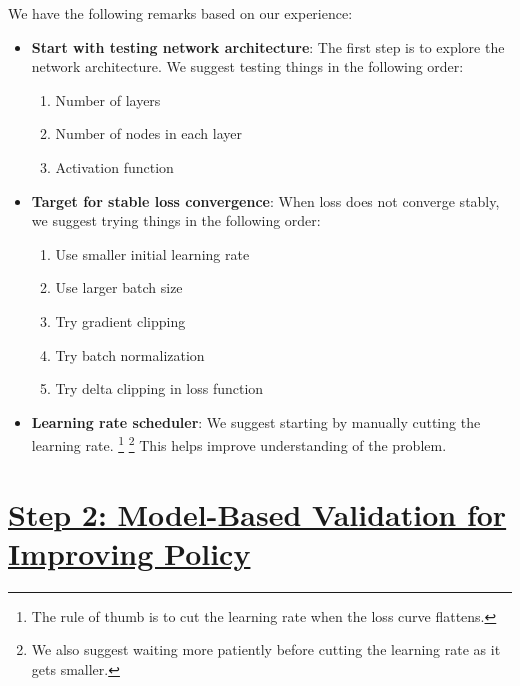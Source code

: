 \documentclass{tufte-handout}
\begin{document}
We have the following remarks based on our experience:
\begin{itemize}
    \item \textbf{Start with testing network architecture}: 
    The first step is to explore the network architecture. 
    We suggest testing things in the following order:
    \begin{enumerate}
        \item Number of layers
        \item Number of nodes in each layer
        \item Activation function
    \end{enumerate}
    \item \textbf{Target for stable loss convergence}: 
    When loss does not converge stably, we suggest trying things in the following order:
    \begin{enumerate}
        \item Use smaller initial learning rate
        \item Use larger batch size
        \item Try gradient clipping
        \item Try batch normalization
        \item Try delta clipping in loss function
    \end{enumerate}
    \item \textbf{Learning rate scheduler}: 
    We suggest starting by manually cutting the learning rate. 
    \footnote{The rule of thumb is to cut the learning rate when the loss curve flattens.}
    \footnote{We also suggest waiting more patiently before cutting the learning rate as it gets smaller.}
    This helps improve understanding of the problem.
\end{itemize}



\section{\underline{Step 2: Model-Based Validation for Improving Policy}}\label{sec:improve-policy-performance}
\end{document}
